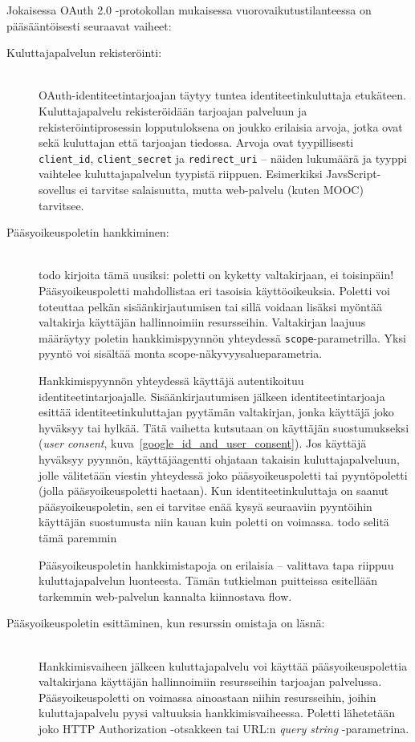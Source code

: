 \documentclass[finnish,gradu]{tktltiki}
\begin{document}
  Jokaisessa OAuth 2.0 -protokollan mukaisessa vuorovaikutustilanteessa on pääsääntöisesti seuraavat vaiheet:

  \begin{description}
    \item[Kuluttajapalvelun rekisteröinti:] \hfill \\
     OAuth-identiteetintarjoajan täytyy tuntea identiteetinkuluttaja etukäteen. Kuluttajapalvelu rekisteröidään tarjoajan palveluun ja rekisteröintiprosessin lopputuloksena on joukko erilaisia arvoja, jotka ovat sekä kuluttajan että tarjoajan tiedossa. Arvoja ovat tyypillisesti \verb!client_id!, \verb!client_secret! ja \verb!redirect_uri! -- näiden lukumäärä ja tyyppi vaihtelee kuluttajapalvelun tyypistä riippuen. Esimerkiksi JavsScript-sovellus ei tarvitse salaisuutta, mutta web-palvelu (kuten MOOC) tarvitsee.

    \item[Pääsyoikeuspoletin hankkiminen:] \hfill \\
  todo kirjoita tämä uusiksi: poletti on kyketty valtakirjaan, ei toisinpäin!
  Pääsyoikeuspoletti mahdollistaa eri tasoisia käyttöoikeuksia. Poletti voi toteuttaa pelkän sisäänkirjautumisen tai sillä voidaan lisäksi myöntää valtakirja käyttäjän hallinnoimiin resursseihin. Valtakirjan laajuus määräytyy poletin hankkimispyynnön yhteydessä \verb!scope!-parametrilla. Yksi pyyntö voi sisältää monta scope-näkyvyysalueparametria.

  Hankkimispyynnön yhteydessä käyttäjä autentikoituu identiteetintarjoajalle. Sisäänkirjautumisen jälkeen identiteetintarjoaja esittää identiteetinkuluttajan pyytämän valtakirjan, jonka käyttäjä joko hyväksyy tai hylkää. Tätä vaihetta kutsutaan on käyttäjän suostumukseksi (\emph{user consent}, kuva~\ref{google_id_and_user_consent}). Jos käyttäjä hyväksyy pyynnön, käyttäjäagentti ohjataan takaisin kuluttajapalveluun, jolle välitetään viestin yhteydessä joko pääsyoikeuspoletti tai pyyntöpoletti (jolla pääsyoikeuspoletti haetaan). Kun identiteetinkuluttaja on saanut pääsyoikeuspoletin, sen ei tarvitse enää kysyä seuraaviin pyyntöihin käyttäjän suostumusta niin kauan kuin poletti on voimassa. todo selitä tämä paremmin

  Pääsyoikeuspoletin hankkimistapoja on erilaisia -- valittava tapa riippuu kuluttajapalvelun luonteesta.
  Tämän tutkielman puitteissa esitellään tarkemmin web-palvelun kannalta kiinnostava flow.

    \item[Pääsyoikeuspoletin esittäminen, kun resurssin omistaja on läsnä:] \hfill \\
  Hankkimisvaiheen jälkeen kuluttajapalvelu voi käyttää pääsyoikeuspolettia valtakirjana käyttäjän hallinnoimiin resursseihin tarjoajan palvelussa. Pääsyoikeuspoletti on voimassa ainoastaan niihin resursseihin, joihin kuluttajapalvelu pyysi valtuuksia hankkimisvaiheessa. Poletti lähetetään joko HTTP Authorization -otsakkeen tai URL:n \emph{query string} -parametrina.


\end{description}
\end{document}
